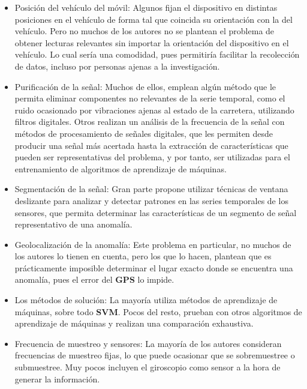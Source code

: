 	\begin{itemize}
		\item Posición del vehículo del móvil: Algunos fijan el dispositivo en distintas posiciones en el vehículo de forma tal que coincida su orientación
			con la del vehículo. Pero no muchos de los autores no se plantean el problema de obtener lecturas relevantes sin importar la orientación del
			dispositivo en el vehículo. Lo cual sería una comodidad, pues permitiría facilitar la recolección de datos, incluso por personas ajenas a la
			investigación.

		\item Purificación de la señal: Muchos de ellos, emplean algún método que le permita eliminar componentes no relevantes de la serie temporal, como
			el ruido ocasionado por vibraciones ajenas al estado de la carretera, utilizando filtros digitales. Otros realizan un análisis de la frecuencia
			de la señal con métodos de procesamiento de señales digitales, que les permiten desde producir una señal más acertada hasta la extracción de
			características que pueden ser representativas del problema, y por tanto, ser utilizadas para el entrenamiento de algoritmos de aprendizaje
			de máquinas.

		\item Segmentación de la señal: Gran parte propone utilizar técnicas de ventana deslizante para analizar y detectar
			patrones en las series temporales de los sensores, que permita determinar las características de un segmento de señal representativo de
			una anomalía.

		\item Geolocalización de la anomalía: Este problema en particular, no muchos de los autores lo tienen en cuenta, pero los que lo hacen, plantean
			que es prácticamente imposible determinar el lugar exacto donde se encuentra una anomalía, pues el error del \textbf{GPS} lo impide. 

		\item Los métodos de solución: La mayoría utiliza métodos de aprendizaje de máquinas, sobre todo \textbf{SVM}. Pocos del resto, prueban con 
			otros algoritmos de aprendizaje de máquinas y realizan una comparación exhaustiva.

		\item Frecuencia de muestreo y sensores: La mayoría de los autores consideran frecuencias de muestreo fijas, lo que puede ocasionar que se sobremuestree o 
			submuestree. Muy pocos incluyen el giroscopio como sensor a la hora de generar la información.
	\end{itemize}


